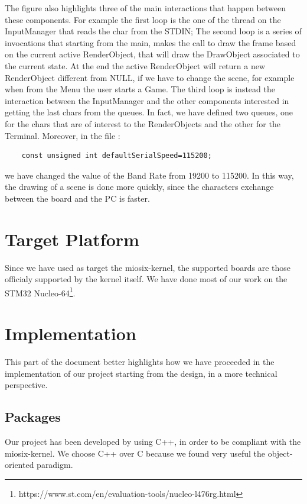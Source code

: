 \documentclass{article}
\begin{document}
The figure also highlights three of the main interactions that happen between these components.
For example the first loop is the one of the thread on the InputManager that reads the char from the STDIN;
The second loop is a series of invocations that starting from the main, makes the call to draw the frame based on the current active RenderObject, that will draw the DrawObject associated to the current state.
At the end the active RenderObject will return a new RenderObject different from NULL, if we have to change the scene, for example when from the Menu the user starts a Game.
The third loop is instead the interaction between the InputManager and the other components interested in getting the last chars from the queues. In fact, we have defined two queues, one for the chars that are of interest to the RenderObjects and the other for the Terminal.
Moreover, in the file :
\begin{verbatim}
    const unsigned int defaultSerialSpeed=115200;
\end{verbatim}
we have changed the value of the Band Rate from 19200 to 115200. In this way, the drawing of a scene is done more quickly, since the characters exchange between the board and the PC is faster.

\section{Target Platform}
Since we have used as target the miosix-kernel, the supported boards are those officialy supported by the kernel itself. We have done most of our work on the STM32 Nucleo-64\footnote{https://www.st.com/en/evaluation-tools/nucleo-l476rg.html}.

\section{Implementation}
This part of the document better highlights how we have proceeded in the implementation of our project starting from the design, in a more technical perspective.

\subsection{Packages}
Our project has been developed by using C++\cite{slidec++}, in order to be compliant with the miosix-kernel\cite{miosix}.
We choose C++ over C because we found very useful the object-oriented paradigm. 
\end{document}

